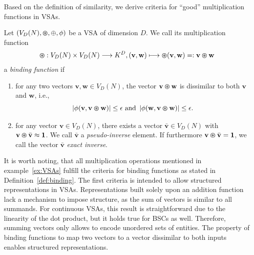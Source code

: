 Based on the definition of similarity, we derive criteria for \enquote{good} multiplication functions in \acp{VSA}.
\begin{defn}
	\label{def:binding}
	Let $(V_{D}(N), \varoast, \oplus, \phi)$ be a \acrfull{VSA} of dimension $D$. We call its multiplication function
	\[\varoast: V_{D}(N) \times V_{D}(N) \longrightarrow K^{D}, ( \mathbf{v}, \mathbf{w}) \longmapsto \varoast( \mathbf{v}, \mathbf{w}) =: \mathbf{v}\varoast \mathbf{w}\]
	a \emph{binding function} if
	\begin{enumerate}
		\item for any two vectors $ \mathbf{v}, \mathbf{w} \in V_{D}(N)$, the vector $ \mathbf{v} \varoast \mathbf{w}$ is dissimilar to both $ \mathbf{v}$ and $ \mathbf{w}$, i.e.,
		\[
		\left| \phi( \mathbf{v}, \mathbf{v} \varoast \mathbf{w}) \right| \leq \epsilon \textrm{ and } \left| \phi( \mathbf{w}, \mathbf{v} \varoast \mathbf{w}) \right| \leq \epsilon.
		\]
		\item for any vector $ \mathbf{v} \in V_{D}(N)$, there exists a vector $\bar{\mathbf{v}} \in V_{D}(N)$ with $ \mathbf{v} \varoast \bar{\mathbf{v}} \approx \mathbf{1}$. We call $\bar{\mathbf{v}}$ a \emph{pseudo-inverse} element.
		If furthermore $ \mathbf{v} \varoast \bar{\mathbf{v}} = \mathbf{1}$, we call the vector $\bar{\mathbf{v}}$ \emph{exact inverse}.
	\end{enumerate}
\end{defn}
It is worth noting, that all multiplication operations mentioned in example~\ref{ex:VSAs} fulfill the criteria for binding functions as stated in Definition~\ref{def:binding}.
The first criteria is intended to allow structured representations in \acp{VSA}.
Representations built solely upon an addition function lack a mechanism to impose structure, as the sum of vectors is similar to all summands.
For continuous \acp{VSA}, this result is straightforward due to the linearity of the dot product, but it holds true for \acp{BSC} as well.
Therefore, summing vectors only allows to encode unordered sets of entities.
The property of binding functions to map two vectors to a vector dissimilar to both inputs enables structured representations.

